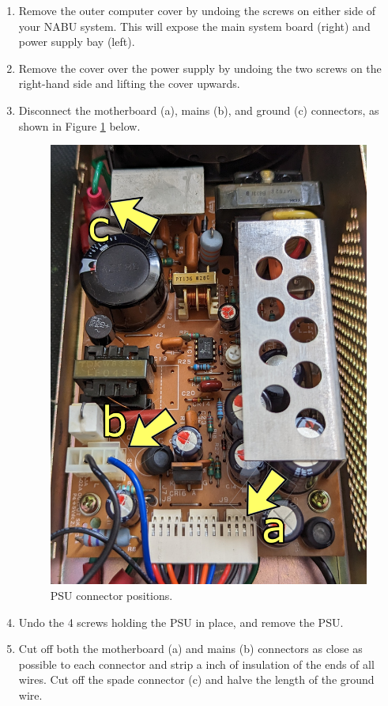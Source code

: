 \begin{enumerate}
	\item Remove the outer computer cover by undoing the screws on either side of your NABU system. This will expose the main system board (right) and power supply bay (left).
	\item Remove the cover over the power supply by undoing the two screws on the right-hand side and lifting the cover upwards.
	\item Disconnect the motherboard (a), mains (b), and ground (c) connectors, as shown in Figure \ref{fig:connectors} below.
	\begin{figure}[b!]
		\includegraphics[width=\columnwidth]{images/psu-image-0.jpg}
		\caption{PSU connector positions.}
		\label{fig:connectors}
	\end{figure}
	\item Undo the 4 screws holding the PSU in place, and remove the PSU.
	\item Cut off both the motherboard (a) and mains (b) connectors as close as possible to each connector and strip a \textonequarter inch of insulation of the ends of all wires. Cut off the spade connector (c) and halve the length of the ground wire.
\end{enumerate}
